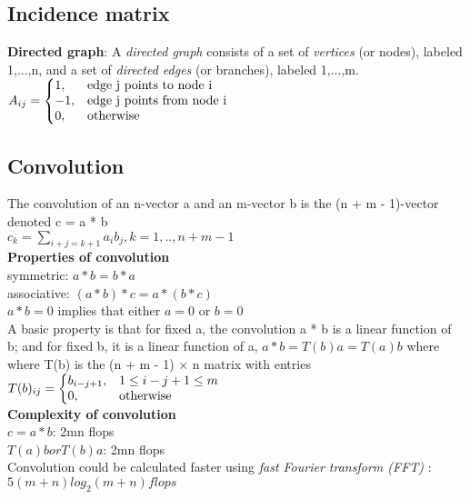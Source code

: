 \subsection{Incidence matrix}
\textbf{Directed graph}: A \textit{directed graph} consists of a set of \textit{vertices} (or nodes), labeled 1,...,n, and a set of \textit{directed edges} (or branches), labeled 1,...,m. \\
$
A_{ij} = \left\{
  \begin{array}{@{}ll@{}}
    1, & \text{edge j points to node i} \\
    -1, & \text{edge j points from node i}\\
    0, & \text{otherwise}
  \end{array}\right.
$\\
\subsection{Convolution}
The convolution of an n-vector a and an m-vector b is the (n + m - 1)-vector denoted c = a * b\\
$c_k = \sum_{i+j=k+1} a_ib_j, k=1,..,n+m-1$\\
\textbf{Properties of convolution}\\
\textbullet symmetric: $a * b = b * a$\\
\textbullet associative: $(a*b)*c = a*(b*c)$\\
\textbullet $a*b = 0$ implies that either $a = 0$ or $b = 0$\\
\textbullet A basic property is that for fixed a, the convolution a * b is a linear function of b; and for fixed b, it is a linear function of a, $a * b = T (b)a = T (a)b$ where where T(b) is the (n + m - 1) × n matrix with entries\\
$
T(b)_{ij} = \left\{
  \begin{array}{@{}ll@{}}
    b_{i-j+1}, & 1\leq i-j+1 \leq m\\
    0, & \text{otherwise}
  \end{array}\right.
$\\
\textbf{Complexity of convolution}\\
\textbullet $c= a * b$: 2mn flops\\
\textbullet $T(a)b or T(b)a$: 2mn flops\\
\textbullet Convolution could be calculated faster using \textit{fast Fourier transform (FFT)} : $5(m + n) log_2(m + n) flops$\\

